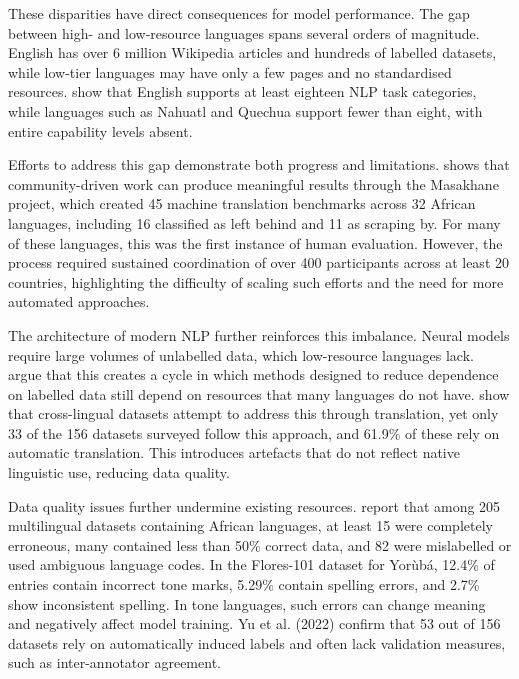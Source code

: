\documentclass[11pt,a4paper]{article}
\begin{document}
These disparities have direct consequences for model performance. The gap between high- and low-resource languages spans several orders of magnitude. English has over 6 million Wikipedia articles and hundreds of labelled datasets, while low-tier languages may have only a few pages and no standardised resources. \citet{hedderich2021survey} show that English supports at least eighteen NLP task categories, while languages such as Nahuatl and Quechua support fewer than eight, with entire capability levels absent.

Efforts to address this gap demonstrate both progress and limitations. \citet{nekoto2020participatory} shows that community-driven work can produce meaningful results through the Masakhane project, which created 45 machine translation benchmarks across 32 African languages, including 16 classified as left behind and 11 as scraping by. For many of these languages, this was the first instance of human evaluation. However, the process required sustained coordination of over 400 participants across at least 20 countries, highlighting the difficulty of scaling such efforts and the need for more automated approaches.

The architecture of modern NLP further reinforces this imbalance. Neural models require large volumes of unlabelled data, which low-resource languages lack. \citet{joshi2020state} argue that this creates a cycle in which methods designed to reduce dependence on labelled data still depend on resources that many languages do not have. \citet{yu2022beyond} show that cross-lingual datasets attempt to address this through translation, yet only 33 of the 156 datasets surveyed follow this approach, and 61.9\% of these rely on automatic translation. This introduces artefacts that do not reflect native linguistic use, reducing data quality.

Data quality issues further undermine existing resources. \citet{adebara2022towards} report that among 205 multilingual datasets containing African languages, at least 15 were completely erroneous, many contained less than 50\% correct data, and 82 were mislabelled or used ambiguous language codes. In the Flores-101 dataset for Yorùbá, 12.4\% of entries contain incorrect tone marks, 5.29\% contain spelling errors, and 2.7\% show inconsistent spelling. In tone languages, such errors can change meaning and negatively affect model training. Yu et al. (2022) confirm that 53 out of 156 datasets rely on automatically induced labels and often lack validation measures, such as inter-annotator agreement.
\end{document}
